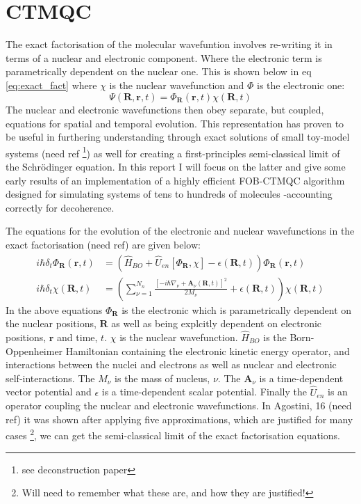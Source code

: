 \section{CTMQC \label{intro:CTMQC}}
The exact factorisation of the molecular wavefuntion involves re-writing it in terms of a nuclear and electronic component. Where the electronic term is parametrically dependent on the nuclear one. This is shown below in eq \eqref{eq:exact_fact} where $\chi$ is the nuclear wavefunction and $\Phi$ is the electronic one:
\begin{equation}
 \Psi(\textbf{R}, \textbf{r}, t) = \Phi_{\textbf{R}}(\textbf{r}, t) \chi(\textbf{R}, t)
 \label{eq:exact_fact}
 \end{equation}
The nuclear and electronic wavefunctions then obey separate, but coupled, equations for spatial and temporal evolution. This representation has proven to be useful in furthering understanding through exact solutions of small toy-model systems (need ref \footnote{see deconstruction paper}) as well for creating a first-principles semi-classical limit of the Schr\"odinger equation. In this report I will focus on the latter and give some early results of an implementation of a highly efficient FOB-CTMQC algorithm designed for simulating systems of tens to hundreds of molecules -accounting correctly for decoherence.


The equations for the evolution of the electronic and nuclear wavefunctions in the exact factorisation (need ref) are given below:
\begin{eqnarray}
  i\hbar \delta_t \Phi_{\textbf{R}}(\textbf{r}, t) &= \left( \hat{H}_{BO} + \hat{U}_{en}\left[ \Phi_{\textbf{R}}, \chi\right] - \epsilon(\textbf{R}, t) \right) \Phi_{\textbf{R}} (\textbf{r}, t)
  \label{eq:electronic_exact}
\\
  i\hbar \delta_t \chi (\textbf{R}, t) &= \left( \sum_{\nu = 1}^{N_{n}} \frac{[-i\hbar\nabla_{\nu} + \textbf{A}_{\nu}(\textbf{R}, t)]^2}{2 M_{\nu}} + \epsilon(\textbf{R}, t)\right) \chi (\textbf{R}, t)
  \label{eq:nuclear_exact}
\end{eqnarray}
In the above equations $\Phi_{\textbf{R}}$ is the electronic which is parametrically dependent on the nuclear positions, $\textbf{R}$ as well as being explcitly dependent on electronic positions, $\textbf{r}$ and time, $t$. $\chi$ is the nuclear wavefunction. $\hat{H}_{BO}$ is the Born-Oppenheimer Hamiltonian containing the electronic kinetic energy operator, and interactions between the nuclei and electrons as well as nuclear and electronic self-interactions. The $M_{\nu}$ is the mass of nucleus, $\nu$. The $\textbf{A}_{\nu}$ is a time-dependent vector potential and $\epsilon$ is a time-dependent scalar potential. Finally the $\hat{U}_{en}$ is an operator coupling the nuclear and electronic wavefunctions. In Agostini, 16 (need ref) it was shown after applying five approximations, which are justified for many cases \footnote{Will need to remember what these are, and how they are justified!}, we can get the semi-classical limit of the exact factorisation equations.



